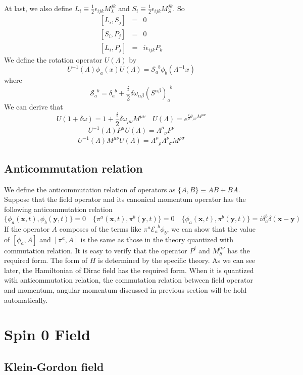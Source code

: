 \documentclass[cyan]{elegantnote}
\begin{document}
At last, we also define $L_i \equiv \frac{1}{2} \epsilon_{ijk} M_L^{jk}$ and $S_i \equiv \frac{1}{2} \epsilon_{ijk} M_S^{jk}$. So
\begin{eqnarray}
\left[L_i,S_j\right] &=& 0 \nonumber \\
\left[S_i,P_j\right] &=& 0 \nonumber \\
\left[L_i,P_j\right] &=& i\epsilon_{ijk}P_k \nonumber
\end{eqnarray}
We define the rotation operator $U(\Lambda)$ by
\[U^{-1}(\Lambda) \phi_a(x) U(\Lambda) = \mathcal{S}_{a}^{\phantom{a}b}\phi_b(\Lambda^{-1}x)\]
where
\[\mathcal{S}_{a}^{\phantom{a}b} = \delta_{a}^{\phantom{a}b}+\frac{i}{2} \delta \omega_{\alpha \beta} (S^{\alpha \beta})_{a}^{\phantom{a}b} \]
We can derive that
\[U(1+\delta \omega) = 1 + \frac{i}{2} \delta \omega_{\mu \nu} M^{\mu \nu} \quad U(\Lambda) = e^{\frac{i}{2} \theta_{\mu \nu} M^{\mu \nu}}\]
\[U^{-1}(\Lambda) P^{\mu} U(\Lambda) = \Lambda^{\mu}_{\phantom{\mu}\nu} P^{\nu}\]
\[U^{-1}(\Lambda) M^{\mu \nu} U(\Lambda) = \Lambda^{\mu}_{\phantom{\mu}\rho} \Lambda^{\nu}_{\phantom{\nu}\sigma}M^{\rho \sigma}\]

\section{Anticommutation relation}
\noindent
We define the anticommutation relation of operators as $\{A,B\} \equiv AB + BA$. Suppose that the field operator and its canonical momentum operator has the following anticommutation relation
\[\{\phi_a(\bm{x},t),\phi_b(\bm{y},t)\} = 0 \quad \{\pi^a(\bm{x},t),\pi^b(\bm{y},t)\} = 0 \quad \{\phi_a(\bm{x},t),\pi^b(\bm{y},t)\} = i \delta_a^b \delta(\bm{x}-\bm{y}) \]
If the operator $A$ composes of the terms like $\pi^a \mathcal{E}_a^{\phantom{a}b} \phi_b$, we can show that the value of $[\phi_a,A]$ and $[\pi^a,A]$ is the same as those in the theory quantized with commutation relation. It is easy to verify that the operator $P^i$ and $M_S^{\mu \nu}$ has the required form. The form of $H$ is determined by the specific theory. As we can see later, the Hamiltonian of Dirac field  has the required form. When it is quantized with anticommutation relation, the commutation relation between field operator and momentum, angular momentum discussed in previous section will be hold automatically. 

\chapter{Spin 0 Field}
\section{Klein-Gordon field}
\end{document}

